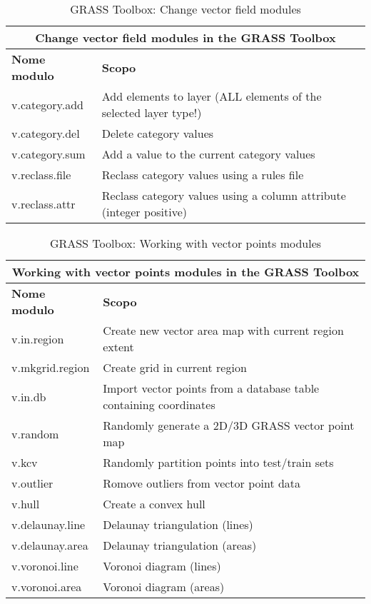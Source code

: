\begin{table}[ht]
\centering
\caption{GRASS Toolbox: Change vector field modules}\medskip
 \begin{tabular}{|p{4cm}|p{12cm}|}
  \hline \multicolumn{2}{|c|}{\textbf{Change vector field modules in the GRASS
  Toolbox}} \\
  \hline \textbf{Nome modulo} & \textbf{Scopo} \\
  \hline v.category.add & Add elements to layer (ALL elements of the selected
  layer type!)\\
  \hline v.category.del & Delete category values \\
  \hline v.category.sum & Add a value to the current category values \\
  \hline v.reclass.file & Reclass category values using a rules file \\
  \hline v.reclass.attr & Reclass category values using a column attribute
  (integer positive) \\
\hline
\end{tabular}
\end{table}

\begin{table}[ht]
\centering
\caption{GRASS Toolbox: Working with vector points modules}\medskip
 \begin{tabular}{|p{4cm}|p{12cm}|}
  \hline \multicolumn{2}{|c|}{\textbf{Working with vector points modules in the GRASS Toolbox}} \\
  \hline \textbf{Nome modulo} & \textbf{Scopo} \\
  \hline v.in.region & Create new vector area map with current region extent \\
  \hline v.mkgrid.region & Create grid in current region \\
  \hline v.in.db & Import vector points from a database table containing
  coordinates \\
  \hline v.random & Randomly generate a 2D/3D GRASS vector point map \\
  \hline v.kcv & Randomly partition points into test/train sets \\
  \hline v.outlier & Romove outliers from vector point data \\
  \hline v.hull & Create a convex hull \\
  \hline v.delaunay.line & Delaunay triangulation (lines) \\
  \hline v.delaunay.area & Delaunay triangulation (areas) \\
  \hline v.voronoi.line & Voronoi diagram (lines) \\
  \hline v.voronoi.area & Voronoi diagram (areas) \\
\hline
\end{tabular}
\end{table}

